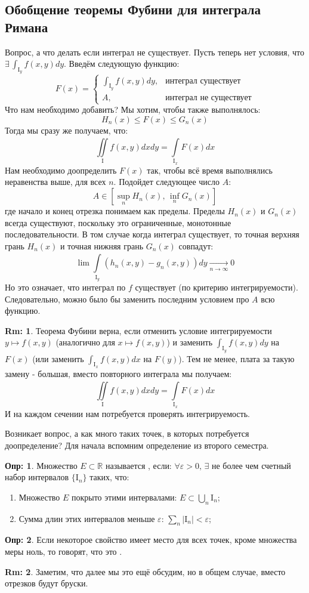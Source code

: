 \documentclass[12pt]{article}
\newcommand{\MR}{\mathbb{R}}
\newcommand{\MI}{\mathrm{I}}
\newcommand{\VE}{\varepsilon}
\theoremstyle{definition}
\newtheorem{defn}{Опр:}
\newtheorem{rem}{Rm:}
\newcommand{\ddint}[2]{\displaystyle\int\limits_{#1}^{#2}}
\begin{document}
\subsection*{Обобщение теоремы Фубини для интеграла Римана}

Вопрос, а что делать если интеграл не существует. Пусть теперь нет условия, что $\exists \, \int_{\MI_y}f(x,y)dy$. Введём следующую функцию:
$$
	F(x) = 
	\begin{cases}
		\int_{\MI_y}f(x,y)dy, & \text{интеграл существует}\\
		A, & \text{интеграл не существует}
	\end{cases}
$$
Что нам необходимо добавить? Мы хотим, чтобы также выполнялось:
$$
	H_n(x) \leq F(x) \leq G_n(x)
$$
Тогда мы сразу же получаем, что:
$$
	\iint\limits_{\MI}{}f(x,y)dxdy = \ddint{\MI_x}{}F(x)dx
$$
Нам необходимо доопределить $F(x)$ так, чтобы всё время выполнялись неравенства выше, для всех $n$. Подойдет следующее число $A$:
$$
	A \in \left[\sup\limits_{n}H_n(x), \, \inf\limits_{n}G_n(x)\right]
$$
где начало и конец отрезка понимаем как пределы. Пределы $H_n(x)$ и $G_n(x)$ всегда существуют, поскольку это ограниченные, монотонные последовательности. В том случае когда интеграл существует, то точная верхняя грань $H_n(x)$ и точная нижняя грань $G_n(x)$ совпадут:
$$
	\lim \ddint{\MI_y}{}(h_n(x,y) - g_n(x,y))dy \xrightarrow[n\to \infty]{} 0
$$
Но это означает, что интеграл по $f$ существует (по критерию интегрируемости). Следовательно, можно было бы заменить последним условием про $A$ всю функцию.
\begin{rem}
	Теорема Фубини верна, если отменить условие интегрируемости $y \mapsto f(x,y)$ (аналогично для $x \mapsto f(x,y)$) и заменить $\int_{\MI_y}f(x,y)dy$ на $F(x)$ (или заменить $\int_{\MI_x}f(x,y)dx$ на $F(y)$). Тем не менее, плата за такую замену - большая, вместо повторного интеграла мы получаем:
	$$
		\iint\limits_{\MI}{}f(x,y)dxdy = \ddint{\MI_x}{}F(x)dx
	$$
	И на каждом сечении нам потребуется проверять интегрируемость.
\end{rem}

Возникает вопрос, а как много таких точек, в которых потребуется доопределение? Для начала вспомним определение из второго семестра.
\begin{defn}
	Множество $E \subset \MR$ называется , если: $\forall \VE > 0, \, \exists$ не более чем счетный набор интервалов $\{\MI_n\}$ таких, что:
	\begin{enumerate}[label={(\arabic*)}]
		\item Множество $E$ покрыто этими интервалами: $E \subset \bigcup_n \MI_n$;
		\item Сумма длин этих интервалов меньше $\VE$: $\sum_{n} |\MI_n| < \VE$;
	\end{enumerate}
\end{defn}
\begin{defn}
	Если некоторое свойство имеет место для всех точек, кроме множества меры ноль, то говорят, что это .
\end{defn}
\begin{rem}
	Заметим, что далее мы это ещё обсудим, но в общем случае, вместо отрезков будут бруски.
\end{rem}
\end{document}
